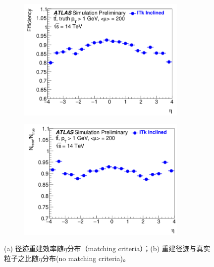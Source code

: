 \begin{figure}[h]
\centering
\begin{subfigure}[b]{0.45\textwidth}
\centering
 \includegraphics[width=0.9\textwidth]{fig/ITk_tracking_eff_tt.png}
 \caption{}
\end{subfigure}
\begin{subfigure}[b]{0.45\textwidth}
\centering
 \includegraphics[width=0.9\textwidth]{fig/ITk_tracking_eff_ratio.png}
 \caption{}
\end{subfigure}
\caption{(a) 径迹重建效率随$\eta$分布（matching criteria）；(b) 重建径迹与真实粒子之比随$\eta$分布(no matching criteria)。\cite{ATL-PHYS-PUB-2016-025}}
\label{fig:ITk_tracking_eff}
\end{figure}
